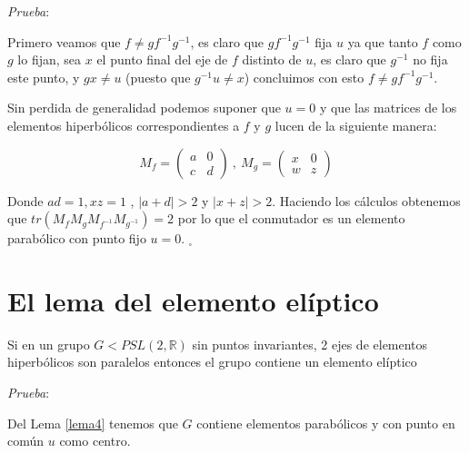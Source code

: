 \textit{Prueba}:

Primero veamos que  $f \neq gf^{-1}g^{-1}$, es claro que
$gf^{-1}g^{-1}$ fija $u$ ya que tanto $f$ como $g$ lo fijan, sea $x$
el punto final del eje de $f$ distinto de $u$, es claro que $g^{-1}$
no fija este punto, y $gx \neq u$ (puesto que $g^{-1}u \neq x$)
concluimos con esto $f \neq gf^{-1}g^{-1}$.

Sin perdida de generalidad podemos suponer que $u=0$ y que las matrices de los elementos hiperb\'olicos correspondientes a $f$ y $g$ lucen de la siguiente manera:

$$M_{f}=    \begin{pmatrix}
 a& 0\\
 c & d
 \end{pmatrix} \  ,  \ M_{g} =     \begin{pmatrix}
 x& 0\\
 w& z
 \end{pmatrix}   $$

 Donde $ad=1,xz=1$ , $|a+d|>2$ y $|x+z|>2$. Haciendo los c\'alculos obtenemos que $tr (M_{f}M_{g}M_{f^{-1}}M_{g^{-1}})=2$ por lo que el conmutador es un elemento parab\'olico con punto fijo $u=0$. $_{\square}$


\section{El lema del elemento el\'iptico}

\begin{lem} \label{lema5}
Si en un grupo $G < PSL(2,\mathbb{R})$ sin puntos invariantes, 2
ejes de elementos hiperb\'olicos son paralelos entonces el grupo
contiene un elemento el\'iptico
\end{lem}


\textit{Prueba}:


Del Lema \ref{lema4} tenemos que $G$ contiene elementos parab\'olicos
y con punto en com\'un $u$ como centro. \\

